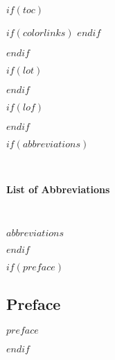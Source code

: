 \documentclass[$if(fontsize)$$fontsize$,$endif$$if(lang)$$babel-lang$,$endif$$if(papersize)$$papersize$paper,$endif$$for(classoption)$$classoption$$sep$,$endfor$]{$documentclass$}
\begin{document}




$if(toc)$
{

$if(colorlinks)$
\hypersetup{linkcolor=$if(toccolor)$$toccolor$$else$black$endif$}
$endif$
\setcounter{tocdepth}{$toc-depth$}
\tableofcontents
}

\newpage
$endif$




$if(lot)$

\clearpage
{}

\listoftables
\newpage
$endif$


$if(lof)$
\clearpage
{}

\listoffigures
$endif$


$if(abbreviations)$
\clearpage
{}

~

\begin{center}
\textbf{List of Abbreviations}
\end{center}

~


\noindent
$abbreviations$
  
$endif$



$if(preface)$

\begin{center}
\chapter*{Preface} 
\end{center}


\doublespacing

\noindent
$preface$

\newpage 
$endif$





\doublespacing
\end{document}
